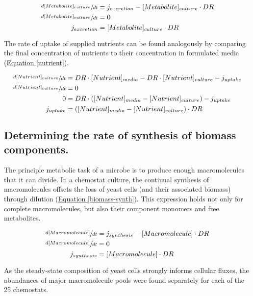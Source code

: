\begin{align}
\sfrac{d[Metabolite]_{culture}}{dt} &= j_{excretion} - [Metabolite]_{culture} \cdot DR\notag\\
\sfrac{d[Metabolite]_{culture}}{dt} &= 0\notag\\
j_{excretion} &= [Metabolite]_{culture} \cdot DR \label{excretion}
\end{align}

The rate of uptake of supplied nutrients can be found analogously by comparing the final concentration of nutrients to their concentration in formulated media (\hyperref[nutrient]{Equation \ref{nutrient}}).

\begin{align}
\sfrac{d[Nutrient]_{culture}}{dt} &= DR \cdot [Nutrient]_{media} - DR \cdot [Nutrient]_{culture} - j_{uptake}\notag\\
\sfrac{d[Nutrient]_{culture}}{dt} &= 0\notag\\
0 &= DR \cdot ([Nutrient]_{media} - [Nutrient]_{culture}) - j_{uptake}\notag\\
 j_{uptake} &= ([Nutrient]_{media} - [Nutrient]_{culture}) \cdot DR\label{nutrient}
\end{align}

\subsection*{Determining the rate of synthesis of biomass components.}

The principle metabolic task of a microbe is to produce enough macromolecules that it can divide.  In a chemostat culture, the continual synthesis of macromolecules offsets the loss of yeast cells (and their associated biomass) through dilution (\hyperref[biomass-synth]{Equation \ref{biomass-synth}}). This expression holds not only for complete macromolecules, but also their component monomers and free metabolites.  

\begin{align}
\sfrac{d[Macromolecule]}{dt} &= j_{synthesis} - [Macromolecule] \cdot DR\notag\\
\sfrac{d[Macromolecule]}{dt} &= 0\notag\\
j_{synthesis} &= [Macromolecule] \cdot DR \label{biomass-synth}
\end{align}

As the steady-state composition of yeast cells strongly informs cellular fluxes, the abundances of major macromolecule pools \cite{Lange:2001th} were found separately for each of the 25 chemostats.

